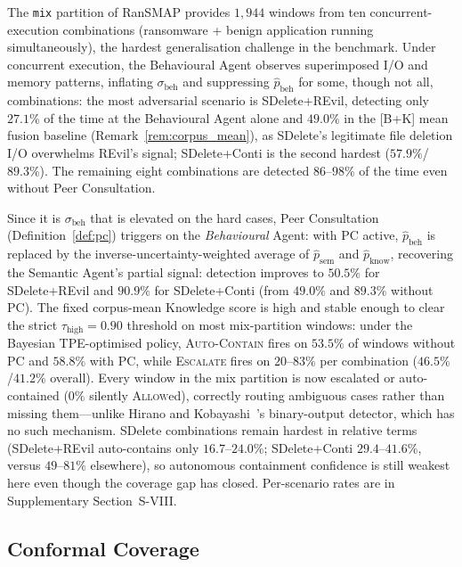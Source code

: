 \documentclass[journal]{IEEEtran}
\begin{document}
The \texttt{mix} partition of RanSMAP provides $1{,}944$ windows from ten
concurrent-execution combinations (ransomware + benign application running
simultaneously), the hardest generalisation challenge in the benchmark.
Under concurrent execution, the Behavioural Agent observes superimposed
I/O and memory patterns, inflating $\sigma_{\text{beh}}$ and suppressing
$\hat{p}_{\text{beh}}$ for some, though not all, combinations: the most
adversarial scenario is SDelete+REvil, detecting only $27.1\%$ of the time
at the Behavioural Agent alone and $49.0\%$ in the [B+K] mean fusion
baseline (Remark~\ref{rem:corpus_mean}), as SDelete's legitimate file
deletion I/O overwhelms REvil's signal; SDelete+Conti is the second
hardest ($57.9\%$/$89.3\%$). The remaining eight combinations are detected
$86$--$98\%$ of the time even without Peer Consultation.

Since it is $\sigma_{\text{beh}}$ that is elevated on the hard cases, Peer
Consultation (Definition~\ref{def:pc}) triggers on the \emph{Behavioural}
Agent: with PC active, $\hat{p}_{\text{beh}}$ is replaced by the
inverse-uncertainty-weighted average of $\hat{p}_{\text{sem}}$ and
$\hat{p}_{\text{know}}$, recovering the Semantic Agent's partial signal:
detection improves to $50.5\%$ for SDelete+REvil and $90.9\%$ for
SDelete+Conti (from $49.0\%$ and $89.3\%$ without PC). The fixed
corpus-mean Knowledge score is high and stable enough to clear the strict
$\tau_{\text{high}}{=}0.90$ threshold on most mix-partition windows: under
the Bayesian TPE-optimised policy, \textsc{Auto-Contain} fires on
$53.5\%$ of windows without PC and $58.8\%$ with PC, while
\textsc{Escalate} fires on $20$--$83\%$ per combination ($46.5\%$/$41.2\%$
overall). Every window in the mix partition is now escalated or
auto-contained ($0\%$ silently \textsc{Allow}ed), correctly routing
ambiguous cases rather than missing them---unlike Hirano and
Kobayashi~\cite{hirano2025ransmap}'s binary-output detector, which has no
such mechanism. SDelete combinations remain hardest in relative terms
(SDelete+REvil auto-contains only $16.7$--$24.0\%$; SDelete+Conti
$29.4$--$41.6\%$, versus $49$--$81\%$ elsewhere), so autonomous
containment confidence is still weakest here even though the coverage
gap has closed. Per-scenario rates are in Supplementary Section~S-VIII.

\subsection{Conformal Coverage}\label{sec:results_conformal}
\end{document}
